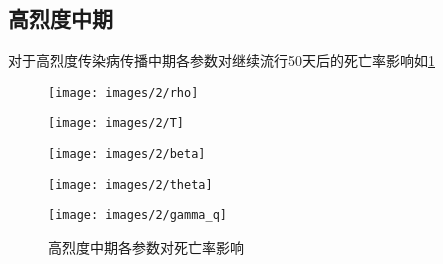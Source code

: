 \documentclass[withoutpreface,bwprint]{cumcmthesis}
\begin{document}
\subsection{高烈度中期}

对于高烈度传染病传播中期各参数对继续流行50天后的死亡率影响如\cref{fig:7}
\begin{figure}[H]
    \centering
    \begin{minipage}[c]{0.3\textwidth}
        \centering
        \texttt{[image: images/2/rho]}
        \subcaption{$\rho$}
    \end{minipage}
    \begin{minipage}[c]{0.3\textwidth}
        \centering
        \texttt{[image: images/2/T]}
    \end{minipage}
    \begin{minipage}[c]{0.3\textwidth}
        \centering
        \texttt{[image: images/2/beta]}
        \subcaption{$\beta$}
    \end{minipage}

    \begin{minipage}[c]{0.3\textwidth}
        \centering
        \texttt{[image: images/2/theta]}
        \subcaption{$\theta$}
    \end{minipage}
    \begin{minipage}[c]{0.3\textwidth}
        \centering
        \texttt{[image: images/2/gamma\_q]}
    \end{minipage}
    \caption{高烈度中期各参数对死亡率影响}
    \label{fig:7}

\end{figure}
\end{document}
